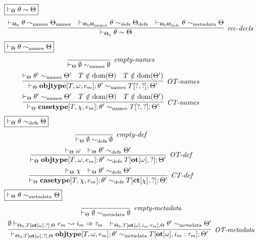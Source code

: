 \begin{figure}[t]
$\fbox{$\vdash_\Theta \theta \sim \Theta$}$
\[
\begin{array}{c}
\infer[\textit{rec-decls}]
  {\vdash_{\Theta_0} \theta \sim \Theta}
  { \vdash_{\Theta_0} \theta \sim_{\text{names}} \Theta_{\text{names}}
  & \vdash_{\Theta_0 \Theta_{\text{names}}} \theta \sim_{\text{defs}} \Theta_{\text{defs}}
  & \vdash_{\Theta_0 \Theta_{\text{defs}}} \theta \sim_{\text{metadata}} \Theta
  } 
\end{array}
\]
$\fbox{$\vdash_\Theta \theta \sim_{\text{names}} \Theta$}$
\[
\begin{array}{c}
\infer[\textit{empty-names}]
  {\vdash_{\Theta} \emptyset \sim_{\text{names}} \emptyset}
  { }\\[1ex] 
  
\infer[\textit{OT-names}]
  {\vdash_{\Theta} \keyw{objtype}[T,\omega,e_m];\theta' \sim_{\text{names}} T[?,?];\Theta'}
  {\vdash_{\Theta} \theta' \sim_{\text{names}} \Theta'
  & T \notin \text{dom}(\Theta) & T \notin \text{dom}(\Theta')}\\[1ex]

\infer[\textit{CT-names}]
  {\vdash_{\Theta} \keyw{casetype}[T,\chi,e_m];\theta' \sim_{\text{names}} T[?,?];\Theta'}
  {\vdash_{\Theta} \theta' \sim_{\text{names}} \Theta'
  & T \notin \text{dom}(\Theta) & T \notin \text{dom}(\Theta')}
\end{array}
\]
$\fbox{$\vdash_\Theta \theta \sim_{\text{defs}} \Theta$}$
\[
\begin{array}{c}
\infer[\textit{empty-def}]
  {\vdash_{\Theta} \emptyset \sim_{\text{defs}} \emptyset}
  { }\\[1ex] 
  
\infer[\textit{OT-def}]
  {\vdash_{\Theta} \keyw{objtype}[T,\omega,e_m];\theta' \sim_{\text{defs}} T[\keyw{ot}[\omega], ?]; \Theta'}
  { \vdash_\Theta \omega
  & \vdash _\Theta \theta' \sim_{\text{defs}} \Theta'}\\[1ex]

\infer[\textit{CT-def}]
  {\vdash_{\Theta} \keyw{casetype}[T,\chi,e_m];\theta' \sim_{\text{defs}} T[\keyw{ct}[\chi], ?]; \Theta'}
  { \vdash_\Theta \chi
  & \vdash _\Theta \theta' \sim_{\text{defs}} \Theta'}
\end{array}
\]
$\fbox{$\vdash_\Theta \theta \sim_{\text{metadata}} \Theta$}$
\[
\begin{array}{c}
\infer[\textit{empty-metadata}]
  {\vdash_{\Theta} \emptyset \sim_{\text{metadata}} \emptyset}
  { }\\[1ex]
\infer[\textit{OT-metadata}]
  {\vdash_{\Theta_0, T[\keyw{ot}[\omega],?], \Theta} \keyw{objtype}[T, \omega, e_m]; \theta' \sim_{\text{metadata}} T[\keyw{ot}[\omega],i_m:\tau_m]; \Theta'}
  { \emptyset \vdash_{\Theta_0, T[\keyw{ot}[\omega], ?], \Theta} e_m \leadsto i_m \Rightarrow \tau_m
  & \vdash_{\Theta_0, T[\keyw{ot}[\omega], i_m : \tau_m], \Theta} \theta' \sim_{\text{metadata}} \Theta'}\\[1ex]


\end{array}\]
\end{figure}
